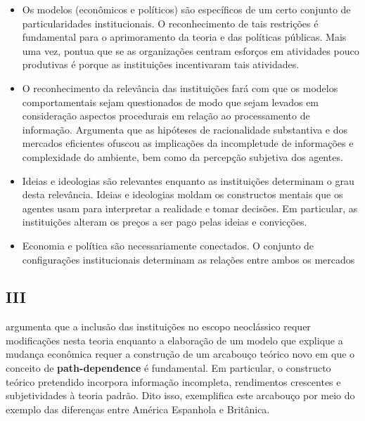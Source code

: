 \begin{itemize}
	\item Os modelos (econômicos e políticos) são específicos de um certo conjunto de particularidades institucionais. O reconhecimento de tais restrições é fundamental para o aprimoramento da teoria e das políticas públicas. Mais uma vez, pontua que se as organizações centram esforços em atividades pouco produtivas é porque as instituições incentivaram tais atividades.
	\item O reconhecimento da relevância das instituições fará com que os modelos comportamentais sejam questionados de modo que sejam levados em consideração aspectos procedurais em relação ao processamento de informação. Argumenta que as hipóteses de racionalidade substantiva e dos mercados eficientes ofuscou as implicações da incompletude de informações e complexidade do ambiente, bem como da percepção subjetiva dos agentes.
	\item Ideias e ideologias são relevantes enquanto as instituições determinam o grau desta relevância. Ideias e ideologias moldam os constructos mentais que os agentes usam para interpretar a realidade e tomar decisões. Em particular, as instituições alteram os preços a ser pago pelas ideias e convicções.
	\item Economia e política são necessariamente conectados. O conjunto de configurações institucionais determinam as relações entre ambos os mercados
\end{itemize}


\subsection*{III}

\autor argumenta que a inclusão das instituições no escopo neoclássico requer modificações nesta teoria enquanto a elaboração de um modelo que explique a mudança econômica requer a construção de um arcabouço teórico novo em que o conceito de \textbf{path-dependence} é fundamental. Em particular, o constructo teórico pretendido incorpora informação incompleta, rendimentos crescentes e subjetividades à teoria padrão. Dito isso, exemplifica este arcabouço por meio do exemplo das diferenças entre América Espanhola e Britânica.

